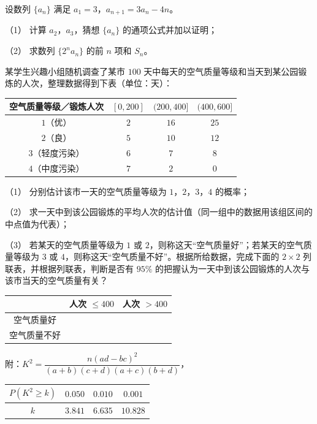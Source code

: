 \begin{question}
设数列 $\{a_n\}$ 满足 $a_1=3$，$a_{n+1}=3a_n-4n$。

（1） 计算 $a_2$，$a_3$，猜想 $\{a_n\}$ 的通项公式并加以证明；

（2） 求数列 $\{2^na_n\}$ 的前 $n$ 项和 $S_n$。

\end{question}
\begin{question}
某学生兴趣小组随机调查了某市 $100$ 天中每天的空气质量等级和当天到某公园锻炼的人次，整理数据得到下表（单位：天）：

\begin{center}
\begin{tabular}{cccc}
\toprule
空气质量等级／锻炼人次 & $[0,200]$ & $(200,400]$ & $(400,600]$ \\
\midrule
$1$（优） & $2$ & $16$ & $25$ \\
$2$（良） & $5$ & $10$ & $12$ \\
$3$（轻度污染） & $6$ & $7$ & $8$ \\
$4$（中度污染） & $7$ & $2$ & $0$ \\
\bottomrule
\end{tabular}
\end{center}

（1） 分别估计该市一天的空气质量等级为 $1$，$2$，$3$，$4$ 的概率；

（2） 求一天中到该公园锻炼的平均人次的估计值（同一组中的数据用该组区间的中点值为代表）；

（3） 若某天的空气质量等级为 $1$ 或 $2$，则称这天“空气质量好”；若某天的空气质量等级为 $3$ 或 $4$，则称这天“空气质量不好”。根据所给数据，完成下面的 $2\times2$ 列联表，并根据列联表，判断是否有 $95\%$ 的把握认为一天中到该公园锻炼的人次与该市当天的空气质量有关？

\begin{center}
\begin{tabular}{ccc}
\toprule
 & 人次 $\leqslant400$ & 人次 $>400$ \\
\midrule
空气质量好 &  &  \\
空气质量不好 &  &  \\
\bottomrule
\end{tabular}
\end{center}

附：$K^2=\dfrac{n(ad-bc)^2}{(a+b)(c+d)(a+c)(b+d)}$，

\begin{center}
\begin{tabular}{cccc}
\toprule
$P(K^2\geqslant k)$ & $0.050$ & $0.010$ & $0.001$ \\
\midrule
$k$ & $3.841$ & $6.635$ & $10.828$ \\
\bottomrule
\end{tabular}
\end{center}

\Needspace{0.4\textheight}
\end{question}
